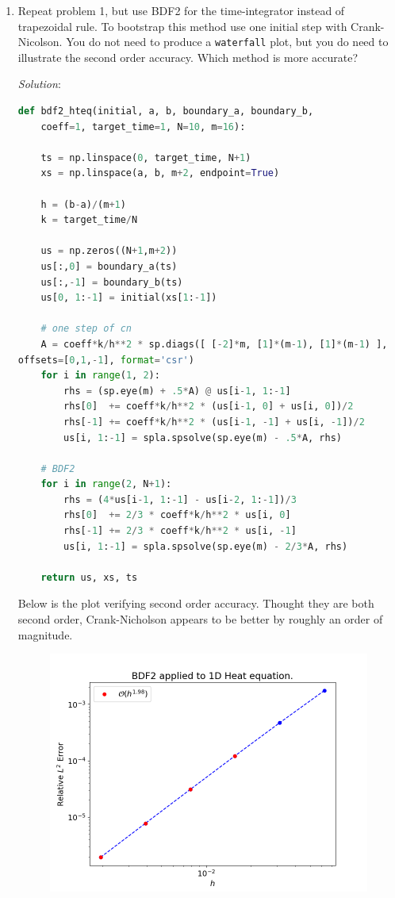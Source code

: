 \documentclass[final,oneside,onecolumn]{article}
\begin{document}
\begin{enumerate}
\medskip

\item Repeat problem 1, but use BDF2 for the time-integrator instead of trapezoidal rule.  To bootstrap this method use one initial step with Crank-Nicolson.  You do not need to produce a \verb|waterfall| plot, but you do need to illustrate the second order accuracy.  Which method is more accurate?
\bigbreak

\textit{Solution}:
\begin{lstlisting}[language=Python]
def bdf2_hteq(initial, a, b, boundary_a, boundary_b, 
    coeff=1, target_time=1, N=10, m=16):
    
    ts = np.linspace(0, target_time, N+1)
    xs = np.linspace(a, b, m+2, endpoint=True)
    
    h = (b-a)/(m+1)
    k = target_time/N
    
    us = np.zeros((N+1,m+2))
    us[:,0] = boundary_a(ts)
    us[:,-1] = boundary_b(ts)
    us[0, 1:-1] = initial(xs[1:-1])
    
    # one step of cn
    A = coeff*k/h**2 * sp.diags([ [-2]*m, [1]*(m-1), [1]*(m-1) ], 
offsets=[0,1,-1], format='csr')
    for i in range(1, 2):
        rhs = (sp.eye(m) + .5*A) @ us[i-1, 1:-1]
        rhs[0]  += coeff*k/h**2 * (us[i-1, 0] + us[i, 0])/2
        rhs[-1] += coeff*k/h**2 * (us[i-1, -1] + us[i, -1])/2
        us[i, 1:-1] = spla.spsolve(sp.eye(m) - .5*A, rhs)
    
    # BDF2
    for i in range(2, N+1):
        rhs = (4*us[i-1, 1:-1] - us[i-2, 1:-1])/3
        rhs[0]  += 2/3 * coeff*k/h**2 * us[i, 0]
        rhs[-1] += 2/3 * coeff*k/h**2 * us[i, -1]
        us[i, 1:-1] = spla.spsolve(sp.eye(m) - 2/3*A, rhs)
    
    return us, xs, ts
\end{lstlisting}
Below is the plot verifying second order accuracy. Thought they are both second order, Crank-Nicholson appears to be better by roughly an order of magnitude.
\begin{figure}[H]
    \centering
    \includegraphics[width=.8\linewidth]{hw6_p2_convergence}
\end{figure}


\end{enumerate}
\end{document}
